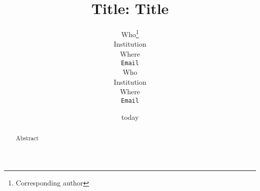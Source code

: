 \documentclass{article}
\title{Title}
\author{}
\date{today}
\title{\myname: Title}
\author{%
  Who\thanks{Corresponding author} \\
  Institution \\
  Where \\
  \texttt{Email} \\
  \And
  Who \\
  Institution \\
  Where \\
  \texttt{Email} \\
  \AND
}
\theoremstyle{plain}
\theoremstyle{definition}
\theoremstyle{remark}
\begin{document}
\maketitle

\begin{abstract}
Abstract
\end{abstract}










\newpage
\appendix

\end{document}
